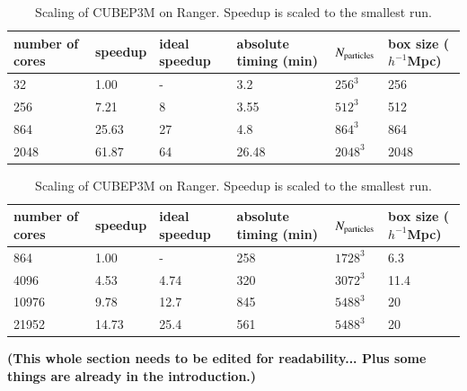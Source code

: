 \begin{table}%
  \vskip -0.5cm 
  \begin{center}
\caption{Scaling of {\small CUBEP3M} on Curie. Speedup is 
scaled to the smallest run.}
\label{summary_scaling_table}
\begin{tabular}{@{}|llllll|}
\hline
number of cores & speedup & ideal speedup & absolute timing (min) & 
$N_{\rm particles}$& box size ($h^{-1}$Mpc)
\\[2mm]\hline
32  &  1.00 & - &3.2 & $256^3$ & 256\\
256  & 7.21 & 8 &3.55 & $512^3$  & 512\\
864  & 25.63 & 27 &4.8 & $864^3$  & 864\\
2048  & 61.87 & 64 &26.48 & $2048^3$ & 2048 \\
\hline
\end{tabular}
\caption{Scaling of  {\small CUBEP3M} on Ranger. Speedup is scaled to the smallest run.}
\label{summary_scaling_table2}
\begin{tabular}{@{}|llllll|}
\hline
number of cores & speedup & ideal speedup & absolute timing (min) & 
$N_{\rm particles}$& box size ($h^{-1}$Mpc)
\\[2mm]\hline
864    & 1.00  & -    &258   & $1728^3$  & 6.3\\
4096   & 4.53  & 4.74 &320   & $3072^3$  & 11.4\\
10976  & 9.78  & 12.7 &845   & $5488^3$  & 20\\
21952  & 14.73 & 25.4 &561   & $5488^3$  & 20 \\
\hline
\end{tabular}
\end{center}
  \vskip -0.7cm 
\end{table}

{\bf (This whole section needs to be edited for readability... Plus some things are already in the introduction.)}

